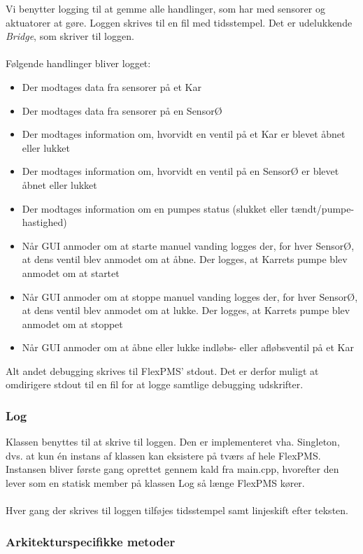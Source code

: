 Vi benytter logging til at gemme alle handlinger, som har med sensorer og aktuatorer at gøre. Loggen skrives til en fil med tidsstempel. Det er udelukkende \textit{Bridge}, som skriver til loggen.\\\\

Følgende handlinger bliver logget:

\begin{itemize}
\item Der modtages data fra sensorer på et Kar
\item Der modtages data fra sensorer på en SensorØ
\item Der modtages information om, hvorvidt en ventil på et Kar er blevet åbnet eller lukket
\item Der modtages information om, hvorvidt en ventil på en SensorØ er blevet åbnet eller lukket
\item Der modtages information om en pumpes status (slukket eller tændt/pumpe-hastighed)
\item Når GUI anmoder om at starte manuel vanding logges der, for hver SensorØ, at dens ventil blev anmodet om at åbne. Der logges, at Karrets pumpe blev anmodet om at startet
\item Når GUI anmoder om at stoppe manuel vanding logges der, for hver SensorØ, at dens ventil blev anmodet om at lukke. Der logges, at Karrets pumpe blev anmodet om at stoppet
\item Når GUI anmoder om at åbne eller lukke indløbs- eller afløbsventil på et Kar
\end{itemize}

Alt andet debugging skrives til FlexPMS' stdout. Det er derfor muligt at omdirigere stdout til en fil for at logge samtlige debugging udskrifter.



\subsubsection{Log}
Klassen benyttes til at skrive til loggen. Den er implementeret vha. Singleton, dvs. at kun én instans af klassen kan eksistere på tværs af hele FlexPMS. Instansen bliver første gang oprettet gennem kald fra main.cpp, hvorefter den lever som en statisk member på klassen Log så længe FlexPMS kører.\\\\

Hver gang der skrives til loggen tilføjes tidsstempel samt linjeskift efter teksten.

\subsubsection{Arkitekturspecifikke metoder}

{}

{
}

